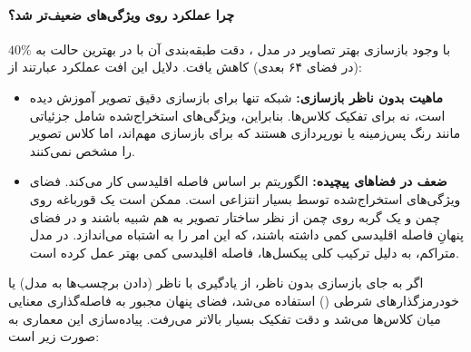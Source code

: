 \documentclass{article}
\begin{document}
\paragraph{چرا عملکرد  روی ویژگی‌های  ضعیف‌تر شد؟}
با وجود بازسازی بهتر تصاویر در مدل ، دقت طبقه‌بندی آن با  در بهترین حالت به $40\%$ (در فضای ۶۴ بعدی) کاهش یافت. دلایل این افت عملکرد عبارتند از:
\begin{itemize}
	\item \textbf{ماهیت بدون ناظر بازسازی:} شبکه  تنها برای بازسازی دقیق تصویر آموزش دیده است، نه برای تفکیک کلاس‌ها. بنابراین، ویژگی‌های استخراج‌شده شامل جزئیاتی مانند رنگ پس‌زمینه یا نورپردازی هستند که برای بازسازی مهم‌اند، اما کلاس تصویر را مشخص نمی‌کنند.
	\item \textbf{ضعف  در فضاهای پیچیده:} الگوریتم  بر اساس فاصله اقلیدسی کار می‌کند. فضای ویژگی‌های استخراج‌شده توسط  بسیار انتزاعی است. ممکن است یک قورباغه روی چمن و یک گربه روی چمن از نظر ساختار تصویر به هم شبیه باشند و در فضای پنهانِ  فاصله اقلیدسی کمی داشته باشند، که این امر  را به اشتباه می‌اندازد. در مدل متراکم، به دلیل ترکیب کلی پیکسل‌ها، فاصله اقلیدسی کمی بهتر عمل کرده است.
\end{itemize}
اگر به جای بازسازی بدون ناظر، از یادگیری با ناظر (دادن برچسب‌ها به مدل) یا خودرمزگذارهای شرطی () استفاده می‌شد، فضای پنهان مجبور به فاصله‌گذاری معنایی میان کلاس‌ها می‌شد و دقت تفکیک بسیار بالاتر می‌رفت.
پیاده‌سازی این معماری به صورت زیر است:
\end{document}
